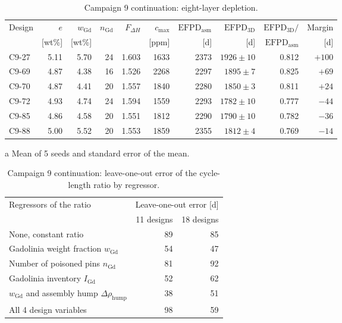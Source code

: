 \begin{table}[!htb]
  \centering
  \begin{threeparttable}
  \caption{Campaign 9 continuation: eight-layer depletion.}
  \label{tab:c9-cont-conf}
  \small
  \setlength{\tabcolsep}{3.8pt}
  \begin{tabular}{@{}lrrrrrrrrr@{}}
    \toprule
    Design & $e$ & $w_\mathrm{Gd}$ & $n_\mathrm{Gd}$ & $F_{\Delta H}$ & $c_\mathrm{max}$ & $\mathrm{EFPD}_\mathrm{asm}$ & $\mathrm{EFPD}_\mathrm{3D}$ & $\mathrm{EFPD}_\mathrm{3D}/$ & Margin \\
     & [wt\%] & [wt\%] & & & [ppm] & [d] & [d] & $\mathrm{EFPD}_\mathrm{asm}$ & [d] \\
    \midrule
    C9-27 & 5.11 & 5.70 & 24 & 1.603 & 1633 & 2373 & $1926 \pm 10$\tnote{a} & 0.812 & $+100$ \\
    C9-69 & 4.87 & 4.38 & 16 & 1.526 & 2268 & 2297 & $1895 \pm 7$  & 0.825 & $+69$ \\
    C9-70 & 4.87 & 4.41 & 20 & 1.557 & 1840 & 2280 & $1850 \pm 3$\tnote{a} & 0.811 & $+24$ \\
        C9-72 & 4.93 & 4.74 & 24 & 1.594 & 1559 & 2293 & $1782 \pm 10$ & 0.777 & $-44$ \\
    \addlinespace
    C9-85 & 4.86 & 4.58 & 20 & 1.551 & 1812 & 2290 & $1790 \pm 10$ & 0.782 & $-36$ \\
    C9-88 & 5.00 & 5.52 & 20 & 1.553 & 1859 & 2355 & $1812 \pm 4$\tnote{a} & 0.769 & $-14$ \\
    \bottomrule
  \end{tabular}
  \begin{tablenotes}[flushleft]\footnotesize
    \item[a] Mean of 5 seeds and standard error of the mean.
  \end{tablenotes}
  \end{threeparttable}
\end{table}

\begin{table}[!htb]
  \centering
  \caption{Campaign 9 continuation: leave-one-out error of the cycle-length ratio by regressor.}
  \label{tab:c9-cont-regressors}
  \small
  \begin{tabular}{@{}lrr@{}}
    \toprule
    Regressors of the ratio & \multicolumn{2}{c}{Leave-one-out error [d]} \\
    \cmidrule(l){2-3}
    & 11 designs & 18 designs \\
    \midrule
    None, constant ratio & 89 & 85 \\
    Gadolinia weight fraction $w_\mathrm{Gd}$ & 54 & 47 \\
    Number of poisoned pins $n_\mathrm{Gd}$ & 81 & 92 \\
    Gadolinia inventory $I_\mathrm{Gd}$ & 52 & 62 \\
    $w_\mathrm{Gd}$ and assembly hump $\Delta\rho_\mathrm{hump}$ & 38 & 51 \\
    All 4 design variables & 98 & 59 \\
    \bottomrule
  \end{tabular}
\end{table}

